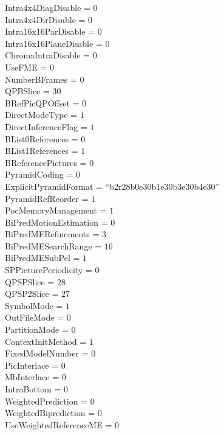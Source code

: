 Intra4x4DiagDisable    = $0$ \\
Intra4x4DirDisable     = $0$ \\
Intra16x16ParDisable   = $0$ \\
Intra16x16PlaneDisable = $0$ \\
ChromaIntraDisable     = $0$ \\
UseFME                =  $0$ \\
NumberBFrames          =  $0$ \\
QPBSlice               = $30$ \\
BRefPicQPOffset        =  $0$ \\
DirectModeType         =  $1$ \\
DirectInferenceFlag    =  $1$ \\
BList0References       =  $0$ \\
BList1References       =  $1$ \\
BReferencePictures     =  $0$ \\
PyramidCoding          =  $0$ \\
ExplicitPyramidFormat  = ``b2r28b0e30b1e30b3e30b4e30'' \\
PyramidRefReorder      =  $1$ \\
PocMemoryManagement    =  $1$ \\
BiPredMotionEstimation = $0$ \\
BiPredMERefinements    = $3$ \\
BiPredMESearchRange    = $16$ \\
BiPredMESubPel         = $1$ \\
SPPicturePeriodicity  =  $0$ \\
QPSPSlice             = $28$ \\
QPSP2Slice            = $27$ \\
SymbolMode             =  $1$ \\
OutFileMode            =  $0$ \\
PartitionMode          =  $0$ \\
ContextInitMethod        =  $1$ \\
FixedModelNumber         =  $0$ \\
PicInterlace             =  $0$ \\
MbInterlace              =  $0$ \\
IntraBottom              =  $0$ \\
WeightedPrediction       =  $0$ \\
WeightedBiprediction     =  $0$ \\
UseWeightedReferenceME   =  $0$ \\
